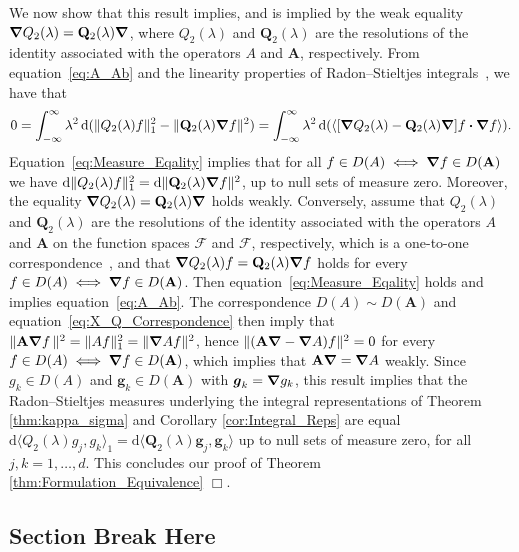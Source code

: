 \documentclass[leqno,onefignum,onetabnum]{siamltex1213}
\renewcommand{\d}{\mathrm{d}}
\newcommand{\Ab}{\mathbf{A}}
\newcommand{\Qb}{\mathbf{Q}}
\newcommand{\Fc}{\mathcal{F}}
\newcommand{\Fs}{\mathscr{F}}
\newcommand\bnabla{\mbox{\boldmath${\nabla}$}}
\providecommand\bcdot{\boldsymbol{\cdot}}
\newcommand{\vecg}{\boldsymbol{g}}
\begin{document}
We now show that this result implies, and is implied by the weak
equality $\bnabla Q_2(\lambda)=\Qb_2(\lambda)\bnabla $, where
$Q_2(\lambda)$ and $\Qb_2(\lambda)$ are the resolutions of the identity associated
with the operators $A$ and $\Ab$, respectively. From
equation~\eqref{eq:A_Ab} and the linearity properties of
Radon--Stieltjes integrals~\cite{Stone:64}, we have that   
%
\begin{align}\label{eq:Measure_Eqality}
  0=\int_{-\infty}^\infty\lambda^2\,\d(\|Q_2(\lambda)f\|_1^2-\|\Qb_2(\lambda)\bnabla f\|^2)
   =\int_{-\infty}^\infty\lambda^2\,\d(\langle[\bnabla Q_2(\lambda)-\Qb_2(\lambda)\bnabla ]f\bcdot\bnabla f\rangle).
\end{align}
%
Equation~\eqref{eq:Measure_Eqality} implies that for all
$f\in D(A)\iff\bnabla f\in D(\Ab)$ we have
$\d\|Q_2(\lambda)f\|_1^2=\d\|\Qb_2(\lambda)\bnabla f\|^2$, up to null sets of measure
zero. Moreover, the equality $\bnabla Q_2(\lambda)=\Qb_2(\lambda)\bnabla $ holds
weakly. Conversely, assume that $Q_2(\lambda)$ and 
$\Qb_2(\lambda)$ are the resolutions of the identity associated with the
operators $A$ and $\Ab$ on the function spaces $\Fs$ and $\Fc$,
respectively, which is a one-to-one correspondence~\cite{Stone:64},
and that $\bnabla Q_2(\lambda)f=\Qb_2(\lambda)\bnabla f$ 
holds for every $f\in D(A)\iff\bnabla f\in D(\Ab)$. Then
equation~\eqref{eq:Measure_Eqality} holds and implies
equation~\eqref{eq:A_Ab}. The correspondence $D(A)\sim D(\Ab)$ and
equation~\eqref{eq:X_Q_Correspondence} then imply that
$\|\Ab\bnabla f\,\|^2=\|Af\|_1^2=\|\bnabla Af\|^2$, hence
$\|(\Ab\bnabla -\bnabla A)f\|^2=0$ for every $f\in D(A)\iff\bnabla f\in D(\Ab)$,
which implies that $\Ab\bnabla =\bnabla A$ weakly. Since $g_k\in D(A)$ and
$\vecg_k\in D(\Ab)$ with $\vecg_k=\bnabla g_k$, this result implies
that the Radon--Stieltjes measures underlying the integral
representations of Theorem \ref{thm:kappa_sigma} and Corollary
\ref{cor:Integral_Reps} are equal
$\d\langle Q_2(\lambda)g_j,g_k\rangle_1=\d\langle\Qb_2(\lambda)\vecg_j,\vecg_k\rangle$ up to null sets
of measure zero, for all $j,k=1,\ldots,d$. This concludes our proof of
Theorem \ref{thm:Formulation_Equivalence} $\Box$.    









\subsection{Section Break Here}
\end{document}
